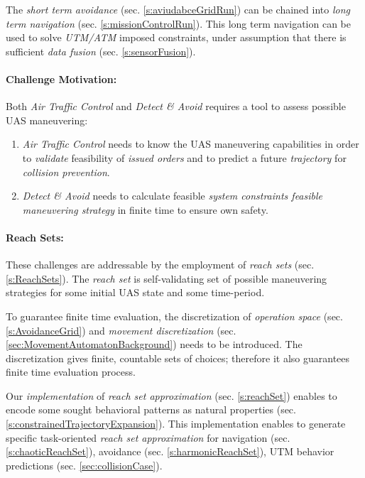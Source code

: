 The \emph{short term avoidance} (sec. \ref{s:aviudabceGridRun}) can be chained into \emph{long term navigation} (sec. \ref{s:missionControlRun}). This long term navigation can be used to solve \emph{UTM/ATM} imposed constraints, under assumption that there is sufficient \emph{data fusion} (sec. \ref{s:sensorFusion}).

\paragraph{Challenge Motivation:} Both \emph{Air Traffic Control} and \emph{Detect \& Avoid} requires a tool to assess possible UAS maneuvering:

\begin{enumerate}
    \item \emph{Air Traffic Control} needs to know the UAS maneuvering capabilities in order to \emph{validate} feasibility of \emph{issued orders} and to predict a future \emph{trajectory} for \emph{collision prevention}.
    
    \item \emph{Detect \& Avoid} needs to calculate feasible \emph{system constraints feasible maneuvering strategy} in finite time to ensure own safety. 
\end{enumerate}

\paragraph{Reach Sets:} These challenges are addressable by the  employment of \emph{reach sets} (sec. \ref{s:ReachSets}). The \emph{reach set} is self-validating set of possible maneuvering strategies for some initial UAS state and some time-period. 

To guarantee finite time evaluation, the discretization of \emph{operation space} (sec. \ref{s:AvoidanceGrid}) and \emph{movement discretization} (sec. \ref{sec:MovementAutomatonBackground}) needs to be introduced. The discretization gives finite, countable sets of choices; therefore it also guarantees finite time evaluation process.

Our \emph{implementation} of \emph{reach set approximation} (sec. \ref{s:reachSet}) enables to encode some sought behavioral patterns as natural properties (sec. \ref{s:constrainedTrajectoryExpansion}). This implementation enables to generate specific task-oriented \emph{reach set approximation} for navigation (sec. \ref{s:chaoticReachSet}), avoidance (sec. \ref{s:harmonicReachSet}), UTM behavior predictions (sec. \ref{sec:collisionCase}). 

